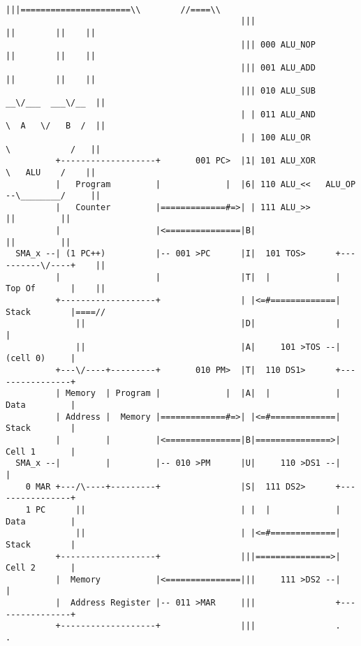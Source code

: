 \begin{figure*}[h!]
\begin{lstlisting}
                                               |||======================\\        //====\\
                                               |||                      ||        ||    ||
                                               ||| 000 ALU_NOP          ||        ||    ||
                                               ||| 001 ALU_ADD          ||        ||    ||
                                               ||| 010 ALU_SUB        __\/___  ___\/__  ||
                                               | | 011 ALU_AND        \  A   \/   B  /  ||
                                               | | 100 ALU_OR          \            /   ||
          +-------------------+       001 PC>  |1| 101 ALU_XOR          \   ALU    /    ||
          |   Program         |             |  |6| 110 ALU_<<   ALU_OP --\________/     ||
          |   Counter         |=============#=>| | 111 ALU_>>                ||         ||
          |                   |<===============|B|                           ||         ||
  SMA_x --| (1 PC++)          |-- 001 >PC      |I|  101 TOS>      +----------\/----+    ||
          |                   |                |T|  |             |   Top Of       |    ||
          +-------------------+                | |<=#=============|   Stack        |====//
              ||                               |D|                |                |
              ||                               |A|     101 >TOS --|   (cell 0)     |
          +---\/----+---------+       010 PM>  |T|  110 DS1>      +----------------+
          | Memory  | Program |             |  |A|  |             |   Data         |
          | Address |  Memory |=============#=>| |<=#=============|   Stack        |
          |         |         |<===============|B|===============>|   Cell 1       |
  SMA_x --|         |         |-- 010 >PM      |U|     110 >DS1 --|                |
    0 MAR +---/\----+---------+                |S|  111 DS2>      +----------------+
    1 PC      ||                               | |  |             |   Data         |
              ||                               | |<=#=============|   Stack        |
          +-------------------+                |||===============>|   Cell 2       |
          |  Memory           |<===============|||     111 >DS2 --|                |
          |  Address Register |-- 011 >MAR     |||                +----------------+
          +-------------------+                |||                .                .

\end{lstlisting}
\end{figure*}
